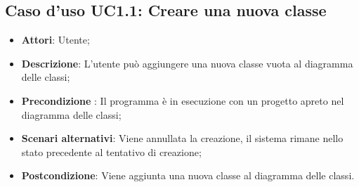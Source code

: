 \documentclass[../AnalisiDeiRequisiti.tex]{subfiles}
\begin{document}
	\subsection{Caso d'uso UC1.1: Creare una nuova classe}
	\begin{itemize}
		\item \textbf{Attori}: Utente;
		
		\item \textbf{Descrizione}: L'utente può aggiungere una nuova classe vuota al diagramma delle classi;
		
		\item \textbf{Precondizione }: Il programma è in esecuzione con un progetto apreto nel diagramma delle classi;
		
		
		\item \textbf{Scenari alternativi}: Viene annullata la creazione, il sistema
		rimane nello stato precedente al tentativo di creazione;
		
		\item \textbf{Postcondizione}: Viene aggiunta una nuova classe al diagramma delle classi.
	\end{itemize}
	
\end{document}
